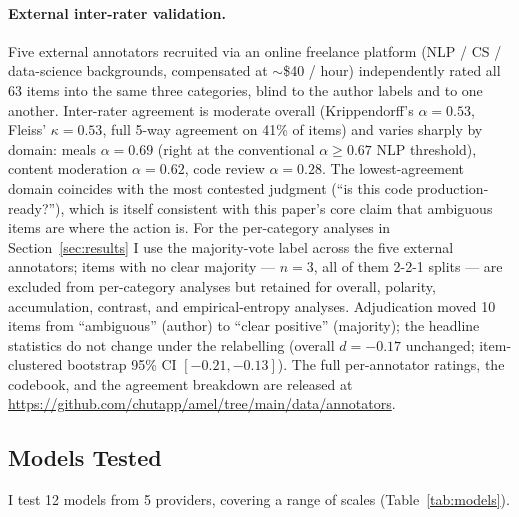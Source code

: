 \documentclass[10pt,twocolumn]{article}
\begin{document}
\paragraph{External inter-rater validation.}
Five external annotators recruited via an online freelance platform (NLP / CS / data-science backgrounds, compensated at $\sim$\$40 / hour) independently rated all 63 items into the same three categories, blind to the author labels and to one another. Inter-rater agreement is moderate overall (Krippendorff's $\alpha = 0.53$, Fleiss' $\kappa = 0.53$, full 5-way agreement on 41\% of items) and varies sharply by domain: meals $\alpha = 0.69$ (right at the conventional $\alpha \geq 0.67$ NLP threshold), content moderation $\alpha = 0.62$, code review $\alpha = 0.28$. The lowest-agreement domain coincides with the most contested judgment (``is this code production-ready?''), which is itself consistent with this paper's core claim that ambiguous items are where the action is. For the per-category analyses in Section~\ref{sec:results} I use the majority-vote label across the five external annotators; items with no clear majority --- $n = 3$, all of them 2-2-1 splits --- are excluded from per-category analyses but retained for overall, polarity, accumulation, contrast, and empirical-entropy analyses. Adjudication moved 10 items from ``ambiguous'' (author) to ``clear positive'' (majority); the headline statistics do not change under the relabelling (overall $d = -0.17$ unchanged; item-clustered bootstrap 95\% CI $[-0.21, -0.13]$). The full per-annotator ratings, the codebook, and the agreement breakdown are released at \url{https://github.com/chutapp/amel/tree/main/data/annotators}.

\subsection{Models Tested}
\label{sec:models}

I test 12 models from 5 providers, covering a range of scales (Table~\ref{tab:models}).
\end{document}
